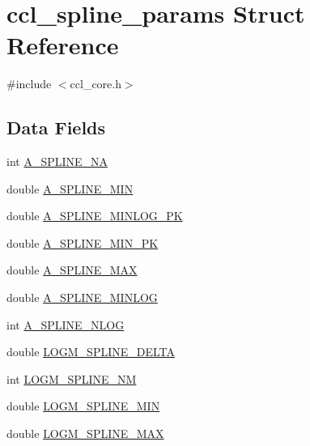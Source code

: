 \hypertarget{structccl__spline__params}{}\section{ccl\+\_\+spline\+\_\+params Struct Reference}
\label{structccl__spline__params}


{\ttfamily \#include $<$ccl\+\_\+core.\+h$>$}

\subsection*{Data Fields}
\begin{DoxyCompactItemize}
\item 
int \mbox{\hyperlink{structccl__spline__params_a5206373ecbc1c9cc7fbce0840dc83e38}{A\+\_\+\+S\+P\+L\+I\+N\+E\+\_\+\+NA}}
\item 
double \mbox{\hyperlink{structccl__spline__params_a43f7b575552fac8d54fd75bd60e42cc7}{A\+\_\+\+S\+P\+L\+I\+N\+E\+\_\+\+M\+IN}}
\item 
double \mbox{\hyperlink{structccl__spline__params_a58ef2cbecc4a7d3100182fd07c90fcf7}{A\+\_\+\+S\+P\+L\+I\+N\+E\+\_\+\+M\+I\+N\+L\+O\+G\+\_\+\+PK}}
\item 
double \mbox{\hyperlink{structccl__spline__params_a800c10517429ab9b35ffccf3bff5f1f0}{A\+\_\+\+S\+P\+L\+I\+N\+E\+\_\+\+M\+I\+N\+\_\+\+PK}}
\item 
double \mbox{\hyperlink{structccl__spline__params_aa227bbd087fee06f845b9de60ff09556}{A\+\_\+\+S\+P\+L\+I\+N\+E\+\_\+\+M\+AX}}
\item 
double \mbox{\hyperlink{structccl__spline__params_ad8e5259b94af0abb124baa51bde42d68}{A\+\_\+\+S\+P\+L\+I\+N\+E\+\_\+\+M\+I\+N\+L\+OG}}
\item 
int \mbox{\hyperlink{structccl__spline__params_a53ec49c7af23118fae9868df9569ff72}{A\+\_\+\+S\+P\+L\+I\+N\+E\+\_\+\+N\+L\+OG}}
\item 
double \mbox{\hyperlink{structccl__spline__params_a9c3639db1ee0c3f352886b0d2cfe7b74}{L\+O\+G\+M\+\_\+\+S\+P\+L\+I\+N\+E\+\_\+\+D\+E\+L\+TA}}
\item 
int \mbox{\hyperlink{structccl__spline__params_a2208a54444d524ccb5fd9de56f548078}{L\+O\+G\+M\+\_\+\+S\+P\+L\+I\+N\+E\+\_\+\+NM}}
\item 
double \mbox{\hyperlink{structccl__spline__params_a8f5efa2b6b537e4bb668d91c93363c0f}{L\+O\+G\+M\+\_\+\+S\+P\+L\+I\+N\+E\+\_\+\+M\+IN}}
\item 
double \mbox{\hyperlink{structccl__spline__params_a26242a0b357c4ccbd5f01b9c5044334a}{L\+O\+G\+M\+\_\+\+S\+P\+L\+I\+N\+E\+\_\+\+M\+AX}}

\end{DoxyCompactItemize}
